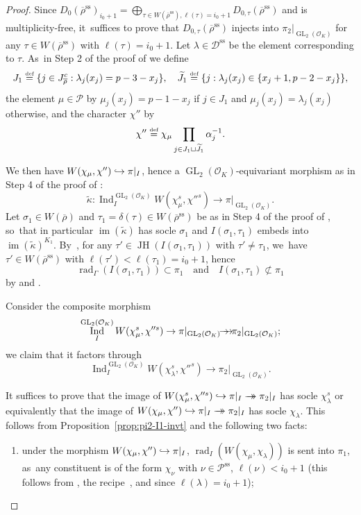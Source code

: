 \documentclass[JEP,XML,SOM,Unicode,NoFloatCountersInSection, NoEqCountersInSection,published]{cedram}
\newcommand\hto{\mathrel{\lhook\joinrel\to}}
\newcommand{\onto}{\mathchoice{\to\hspace*{-5mm}\to}{\mathrel{\hbox{$\to\hspace*{-2.85mm}\to$}}}{\to\hspace*{-3mm}\to}{\to\hspace*{-3mm}\to}}
\newcommand{\quand}{\quad\text{and}\quad}
\let\wt\widetilde
\newcommand{\defeq}{\stackrel{\textrm{\tiny{\upshape{def}}}}{=}}
\newcommand{\cO}{\mathcal{O}}
\newcommand{\D}{\mathscr D}
\renewcommand{\P}{\mathscr P}
\renewcommand{\ss}{\mathrm{ss}}
\newcommand{\brho}{\overline{\rho}}
\DeclareMathOperator{\GL}{GL}
\DeclareMathOperator{\im}{im}
\DeclareMathOperator{\Ind}{Ind}
\DeclareMathOperator{\JH}{\mathrm{JH}}
\DeclareMathOperator{\rad}{rad}
\theoremstyle{plain}
\theoremstyle{definition}
\begin{document}
\begin{proof}
Since $D_0(\brho^\ss)_{i_0+1}=\bigoplus_{\tau\in W(\brho^\ss),\ell(\tau)=i_0+1}D_{0,\tau}(\brho^\ss)$ and is multiplicity-free, it~suffices to prove that $D_{0,\tau}(\brho^\ss)$ injects into $\pi_2|_{\GL_2(\cO_K)}$ for any $\tau\in W(\brho^\ss)$ with $\ell(\tau)=i_0+1$. Let $\lambda\in \D^\ss$ be the element corresponding to $\tau$. As~in Step 2 of the proof of \cite[Th.\,4.3.15]{BHHMS4} we define
\[
J_1\defeq \{j\in J_{\brho}^c:\lambda_j(x_j)=p-3-x_j\}, \quad \wt{J}_1\defeq \{j:\lambda_j(x_j)\in\{x_j+1,p-2-x_j\}\},
\]
the element $\mu\in\P$ by $\mu_j(x_j)=p-1-x_j$ if $j\in J_1$ and $\mu_j(x_j)=\lambda_j(x_j)$ otherwise, and the character $\chi''$ by
\[
\chi''\defeq \chi_{\mu}\prod_{j\in J_1\sqcup \wt{J}_1}\alpha_j^{-1}.
\]

We then have $W(\chi_{\mu},\chi'')\hto \pi|_{I}$, hence a $\GL_2(\cO_K)$-equivariant morphism as in Step 4 of the proof of \cite[Th.\,4.3.15]{BHHMS4}:
\[
\widetilde{\kappa}:\Ind_I^{\GL_2(\cO_K)}W(\chi_{\mu}^s,\chi''^s)\to \pi|_{\GL_2(\cO_K)}.
\]
Let $\sigma_1\in W(\brho)$ and $\tau_1=\delta(\tau)\in W(\brho^\ss)$ be as in Step 4 of the proof of \cite[Th.\,4.3.15]{BHHMS4}, so~that in particular $\im(\wt{\kappa})$ has socle $\sigma_1$ and $I(\sigma_1,\tau_1)$ embeds into $\im(\wt\kappa)^{K_1}$. By~\cite[Lem.\,4.1.3]{BHHMS4}, for any $\tau'\in \JH(I(\sigma_1,\tau_1))$ with $\tau'\neq \tau_1$, we~have $\tau'\in W(\brho^\ss)$ with $\ell(\tau')<\ell(\tau_1)=i_0+1 $, hence
\[
\rad_\Gamma(I(\sigma_1,\tau_1))\subset \pi_1\quand I(\sigma_1,\tau_1)\not\subset \pi_1
\]
by \cite[Th.\,4.3.15]{BHHMS4}
and \cite[Eq.\,(68)]{BHHMS4}.

Consider the composite morphism
\[
\Ind_I^{\GL_2(\cO_K)}W(\chi_{\mu}^s,\chi''^s)\to \pi|_{\GL_2(\cO_K)}\onto \pi_2|_{\GL_2(\cO_K)};
\]
we claim that it factors through
\begin{equation}\label{eq:Ind-pi2}\Ind_I^{\GL_2(\cO_K)}W(\chi_{\lambda}^s,\chi''^s)\to \pi_2|_{\GL_2(\cO_K)}.
\end{equation}

It suffices to prove that the image of $W(\chi_{\mu}^s,\chi''^s)\hto \pi|_I\onto
\pi_2|_I$ has socle $\chi_{\lambda}^s$ or equivalently that the image of $W(\chi_{\mu},\chi'')\hto
\pi|_I\onto \pi_2|_I$ has socle $\chi_{\lambda}$.
This follows from Proposition~\ref{prop:pi2-I1-invt} and the following two facts:
\begin{enumerate}
\item[(a)] under the morphism $W(\chi_{\mu},\chi'')\hto \pi|_I$, $\rad_I(W(\chi_{\mu},\chi_{\lambda}))$ is sent into $\pi_1$, as~any constituent is of the form $\chi_\nu$ with $\nu \in \P^\ss$, $\ell(\nu) < i_0+1$ (this follows from \cite[Lem.\,4.3.1]{BHHMS4}, the recipe~\cite[Eq.\,(61)]{BHHMS4}, and since $\ell(\lambda) = i_0+1$);


\end{enumerate}
\end{proof}
\end{document}
